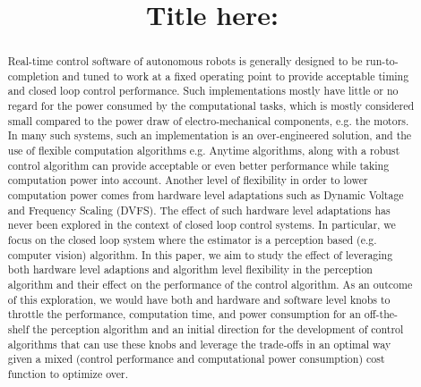 \documentclass{article}[14pt]
\title{Title here:}
\begin{document}
\maketitle

\begin{abstract}
	Real-time control software of autonomous robots is generally designed to be run-to-completion and tuned to work at a fixed operating point to provide acceptable timing and closed loop control performance. Such implementations mostly have little or no regard for the power consumed by the computational tasks, which is mostly considered small compared to the power draw of electro-mechanical components, e.g. the motors. In many such systems, such an implementation is an over-engineered solution, and the use of flexible computation algorithms e.g. Anytime algorithms, along with a robust control algorithm can provide acceptable or even better performance while taking computation power into account. Another level of flexibility in order to lower computation power comes from hardware level adaptations such as Dynamic Voltage and Frequency Scaling (DVFS). The effect of such hardware level adaptations has never been explored in the context of closed loop control systems. In particular, we focus on the closed loop system where the estimator is a perception based (e.g. computer vision) algorithm. In this paper, we aim to study the effect of leveraging both hardware level adaptions and algorithm level flexibility in the perception algorithm and their effect on the performance of the control algorithm. As an outcome of this exploration, we would have both and hardware and software level knobs to throttle the performance, computation time, and power consumption for an off-the-shelf the perception algorithm and an initial direction for the development of control algorithms that can use these knobs and leverage the trade-offs in an optimal way given a mixed (control performance and computational power consumption) cost function to optimize over.

\end{abstract}
\end{document}
